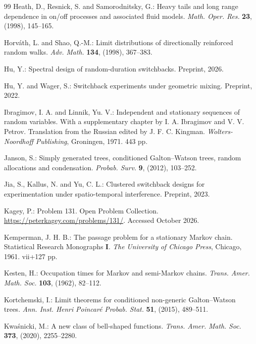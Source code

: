 \documentclass[EJP,preprint]{ejpecp}
\theoremstyle{ejpecpbodyit}
\begin{document}
\begin{thebibliography}{99}
 Heath, D., Resnick, S. and Samorodnitsky, G.: Heavy tails and long range
  dependence in on/off processes and associated fluid models. \emph{Math. Oper. Res.}
  \textbf{23}, (1998), 145--165. 

 Horv\'ath, L. and Shao, Q.-M.: Limit distributions
  of directionally reinforced random walks. \emph{Adv. Math.} \textbf{134},
  (1998), 367--383. 

 Hu, Y.: Spectral design of random-duration switchbacks. Preprint, 2026.

 Hu, Y. and Wager, S.: Switchback experiments under geometric mixing.
  Preprint, 2022. 

 Ibragimov, I. A. and Linnik, Yu. V.:
  Independent and stationary sequences of random variables. With a
  supplementary chapter by I. A. Ibragimov and V. V. Petrov. Translation from
  the Russian edited by J. F. C. Kingman. \emph{Wolters-Noordhoff Publishing},
  Groningen, 1971. 443 pp. 

 Janson, S.: Simply generated trees, conditioned Galton--Watson trees,
  random allocations and condensation. \emph{Probab. Surv.} \textbf{9}, (2012), 103--252.

 Jia, S., Kallus, N. and Yu, C. L.: Clustered switchback designs for
  experimentation under spatio-temporal interference. Preprint, 2023. 

 Kagey, P.: Problem 131. Open Problem Collection.
  \url{https://peterkagey.com/problems/131/}. Accessed October 2026.

 Kemperman, J. H. B.: The passage problem for a stationary Markov
  chain. Statistical Research Monographs \textbf{I}. \emph{The University of Chicago Press},
  Chicago, 1961. vii+127 pp. 

 Kesten, H.: Occupation times for Markov and semi-Markov
  chains. \emph{Trans. Amer. Math. Soc.} \textbf{103}, (1962), 82--112.

 Kortchemski, I.: Limit theorems for conditioned non-generic
  Galton--Watson trees. \emph{Ann. Inst. Henri Poincar\'e Probab. Stat.} \textbf{51}, (2015),
  489--511. 

 Kwa\'snicki, M.: A new class of bell-shaped functions.
  \emph{Trans. Amer. Math. Soc.} \textbf{373}, (2020), 2255--2280. 


\end{thebibliography}
\end{document}

